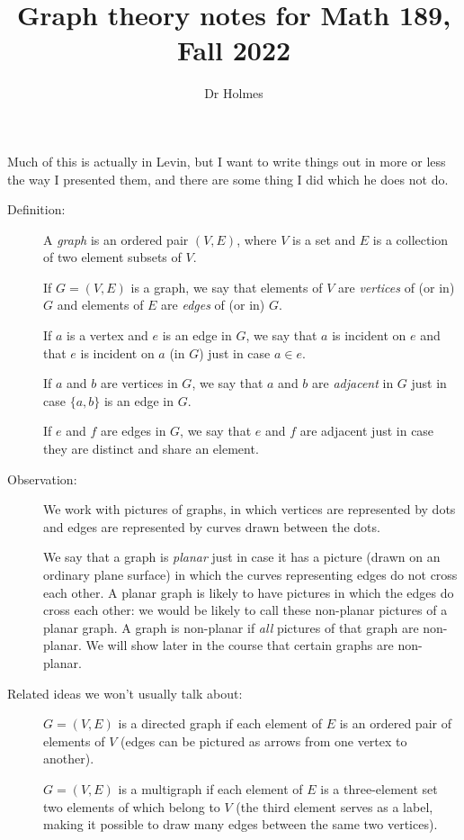 \documentclass[12pt]{article}
\title{Graph theory notes for Math 189, Fall 2022}
\author{Dr Holmes}
\begin{document}
\maketitle

Much of this is actually in Levin, but I want to write things out in more or less the way I presented them, and there are some thing I did which he does not do.

\begin{description}

\item[Definition:]   A {\em graph\/} is an ordered pair $(V,E)$, where $V$ is a set and $E$ is a collection of two element subsets of $V$.

If $G=(V,E)$ is a graph, we say that elements of $V$ are {\em vertices\/} of (or in) $G$ and elements of $E$ are {\em edges\/} of (or in) $G$.

If $a$ is a vertex and $e$ is an edge in $G$, we say that $a$ is incident on $e$ and that $e$ is incident on $a$ (in $G$) just in case $a \in e$.

If $a$ and $b$ are vertices in $G$, we say that $a$ and $b$ are {\em adjacent\/} in $G$ just in case $\{a,b\}$ is an edge in $G$.

If $e$ and $f$ are edges in $G$, we say that $e$ and $f$ are adjacent just in case they are distinct and share an element.

\item[Observation:]  We work with pictures of graphs, in which vertices are represented by dots and edges are represented by curves drawn between the dots.

We say that a graph is {\em planar\/} just in case it has a picture (drawn on an ordinary plane surface) in which the curves representing edges do not cross each other.  A planar graph is likely to have pictures in which the edges do cross each other:  we would be likely to call these non-planar pictures of a planar graph.  A graph is non-planar if {\em all\/} pictures of that graph are non-planar.  We will show later in the course that certain graphs are non-planar.

\item[Related ideas we won't usually talk about:]  $G=(V,E)$ is a directed graph if each element of $E$ is an ordered pair of elements of $V$ (edges can be pictured as arrows from one vertex to another).

$G=(V,E)$ is a multigraph if each element of $E$ is a three-element set two elements of which belong to $V$ (the third element serves as a label, making it possible to draw many edges between the same two vertices).


\end{description}
\end{document}
